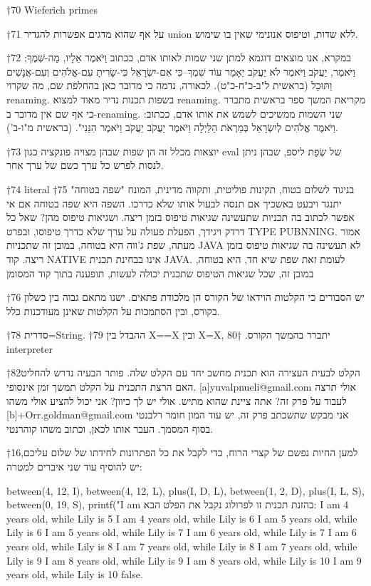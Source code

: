†{70} Wieferich primes

†{71} על אף שהוא מדגים אפשרות להגדיר union ללא שדות, וטיפוס אנונימי שאין בו שימוש.

†{72} במקרא, אנו מוצאים דוגמא למתן שני שמות לאותו אדם, ככתוב וַיֹּאמֶר אֵלָיו,
מַה-שְּׁמֶךָ; וַיֹּאמֶר, יַעֲקֹב וַיֹּאמֶר לֹא יַעֲקֹב יֵאָמֵר עוֹד שִׁמְךָ--כִּי אִם-יִשְׂרָאֵל כִּי-שָׂרִיתָ עִם-אֱלֹהִים
וְעִם-אֲנָשִׁים וַתּוּכָל (בראשית ל"ב-כ"ח-כ"ט). לכאורה, נדמה כי מדובר כאן בהחלפת שם, מה
שקרוי renaming. בשפות תכנות נדיר מאוד למצוא renaming. מקריאת המשך ספר בראשית
מתברר כי אף שם אין מדובר ב-renaming. שני השמות ממשיכים לשמש את אותו אדם, ככתוב:
וַיֹּאמֶר אֱלֹהִים לְיִשְׂרָאֵל בְּמַרְאֹת הַלַּיְלָה וַיֹּאמֶר יַעֲקֹב יַעֲקֹב וַיֹּאמֶר הִנֵּנִי". (בראשית מ"ו-ב').

†{73} יוצאות מכלל זה הן שפות שבהן מצויה פונקציה כגון eval של שְׂפַת ליספ, שבהן
ניתן לנסות לפרש כל ערך כשם של ערך אחר.

†{74} literal
†{75} בניגוד לשלום בטוח, תקינות פוליטית, ותקווה מדינית, המונח "שפה בטוחה" יתנגד
ויבעט באשכיך אם תנסה לבעול אותו שלא כדרכו. השפה היא שפה בטוחה אם אי אפשר לכתוב
בה תכניות שתעשינה שגיאות טיפוס בזמן ריצה. ושגיאות טיפוס מהן? שאל כל דרדק
ויגידך, הפעלת פעולה על ערך שלא כדרך טיפוסו, ובפרט TYPE PUBNNING. אמור מעתה, שפת
ג'ווה היא בטוחה, במובן זה שתכניות JAVA לא תעשינה בה שגיאות טיפוס בזמן ריצה. קוד
NATIVE אינו בבחינת תכנית JAVA. לעומת זאת שפת שיא חד, היא בטוחה, במובן זה, שכל
שגיאות הטיפוס שתכנית יכולה לעשות, תופענה בתוך קוד המסומן

†{76} יש הסבורים כי הקלטות הוידאו של הקורס הן מלכודת פתאים. ישנו מתאם גבוה בין
כשלון בקורס, ובין הסתמכות על הקלטות שאינן מעודכנות כלל.

†{78} סדרית=String.
†{79} ההבדל בין X==X ובין X=X, יתברר בהמשך הקורס.
†{80} interpreter

†{82}הקלט לבעית העצירה הוא תכנית מחשב יחד עם הקלט שלה. פותר הבעיה נדרש להחליט
האם הרצת התכנית על הקלט תמשך זמן אינסופי. [a]yuvalpnueli@gmail.com אולי תרצה
לעבוד על פרק זה? אתה ציינת שהוא מתיש. אולי יש לך כיוון? אני יכול להציע אולי
משהו [b]+Orr.goldman@gmail.com אני מבקש שתשכתב פרק זה, יש עוד המון חומר רלבנטי
בסוף המסמך. העבר אותו לכאן, וכתוב משהו קוהרנטי.

†{16}למען החיות נפשם של קצרי הרוח, כדי לקבל את כל הפתרונות לחידתו של שלום עליכם, יש להוסיף עוד שני איברים למטרה:

        between(4, 12, I), between(4, 12, L),
        plus(I, D, L), between(1, 2, D), plus(I, L, S), between(0, 19, S),
        printf("I am %
        בהזנת תכנית זו לפרולוג נקבל את הפלט הבא:
        I am 4 years old, while Lily is 5
        I am 4 years old, while Lily is 6
        I am 5 years old, while Lily is 6
        I am 5 years old, while Lily is 7
        I am 6 years old, while Lily is 7
        I am 6 years old, while Lily is 8
        I am 7 years old, while Lily is 8
        I am 7 years old, while Lily is 9
        I am 8 years old, while Lily is 9
        I am 8 years old, while Lily is 10
        I am 9 years old, while Lily is 10
        false.

